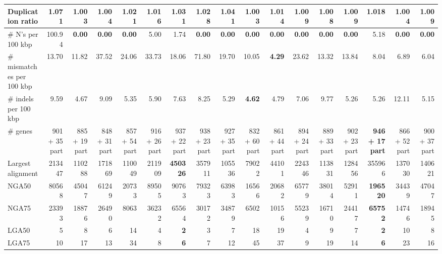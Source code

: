 \documentclass[12pt,a4paper]{article}
\begin{document}
\begin{table}[ht]
\begin{center}
\begin{tabular}{|l*{16}{|r}|}
Duplication ratio & 1.071 & {\bf 1.003} & 1.004 & 1.021 & 1.016 & 1.031 & 1.028 & 1.041 & {\bf 1.003} & 1.014 & 1.009 & 1.008 & 1.009 & 1.018 & 1.004 & 1.009 \\ \hline
\# N's per 100 kbp & 100.94 & {\bf 0.00} & {\bf 0.00} & {\bf 0.00} & 5.00 & 1.74 & {\bf 0.00} & {\bf 0.00} & {\bf 0.00} & {\bf 0.00} & {\bf 0.00} & {\bf 0.00} & {\bf 0.00} & 5.18 & {\bf 0.00} & {\bf 0.00} \\ \hline
\# mismatches per 100 kbp & 13.70 & 11.82 & 37.52 & 24.06 & 33.73 & 18.06 & 71.80 & 19.70 & 10.05 & {\bf 4.29} & 23.62 & 13.32 & 13.84 & 8.04 & 6.89 & 6.04 \\ \hline
\# indels per 100 kbp & 9.59 & 4.67 & 9.09 & 5.35 & 5.90 & 7.63 & 8.25 & 5.29 & {\bf 4.62} & 4.79 & 7.06 & 9.77 & 5.26 & 5.26 & 12.11 & 5.15 \\ \hline
\# genes & 901 + 35 part & 885 + 19 part & 848 + 31 part & 857 + 54 part & 916 + 26 part & 937 + 22 part & 938 + 23 part & 927 + 35 part & 832 + 60 part & 861 + 44 part & 894 + 24 part & 889 + 33 part & 902 + 23 part & {\bf 946 + 17 part} & 866 + 52 part & 900 + 37 part \\ \hline
Largest alignment & 213447 & 110288 & 171869 & 110049 & 211909 & {\bf 450326} & 357911 & 105536 & 79022 & 44101 & 224346 & 113831 & 128456 & 355966 & 137030 & 140621 \\ \hline
NGA50 & 80568 & 45047 & 61249 & 20733 & 89505 & 90763 & 79323 & 63983 & 16566 & 20682 & 65779 & 38014 & 52911 & {\bf 196520} & 34439 & 47047 \\ \hline
NGA75 & 23393 & 18876 & 26490 & 8063 & 36232 & 65564 & 30172 & 34879 & 6502 & 10156 & 55239 & 16710 & 24417 & {\bf 65752} & 14746 & 18945 \\ \hline
LGA50 & 5 & 8 & 6 & 14 & 4 & {\bf 2} & 3 & 7 & 18 & 19 & 4 & 9 & 7 & {\bf 2} & 10 & 8 \\ \hline
LGA75 & 10 & 17 & 13 & 34 & 8 & {\bf 6} & 7 & 12 & 45 & 37 & 9 & 19 & 14 & {\bf 6} & 23 & 16 \\ \hline
\end{tabular}
\end{center}
\end{table}
\end{document}
